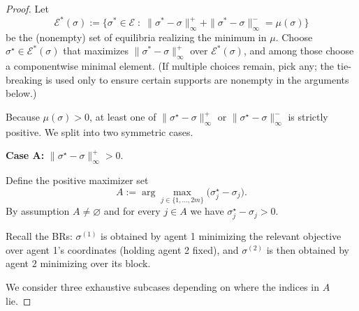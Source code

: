\documentclass[11pt]{article}
\begin{document}
\begin{proof}
Let
\[
\mathcal E^*(\sigma)
:=\Big\{\sigma^*\in\mathcal E \;:\; 
\|\sigma^*-\sigma\|_\infty^+ + \|\sigma^*-\sigma\|_\infty^- = \mu(\sigma)\Big\}
\]
be the (nonempty) set of equilibria realizing the minimum in \(\mu\).
Choose \(\sigma^\star\in\mathcal E^*(\sigma)\) that maximizes
\(\|\sigma^*-\sigma\|_\infty^+\) over \(\mathcal E^*(\sigma)\), and
among those choose a componentwise minimal element. (If multiple
choices remain, pick any; the tie-breaking is used only to ensure
certain supports are nonempty in the arguments below.)

Because \(\mu(\sigma)>0\), at least one of
\(\|\sigma^\star-\sigma\|_\infty^+\) or \(\|\sigma^\star-\sigma\|_\infty^-\)
is strictly positive. We split into two symmetric cases.

\medskip\noindent\textbf{Case A:} \(\|\sigma^\star-\sigma\|_\infty^+>0\).

Define the positive maximizer set
\[
A := \arg\max_{j\in\{1,\dots,2m\}} \big(\sigma^\star_j-\sigma_j\big).
\]
By assumption \(A\neq\varnothing\) and for every \(j\in A\) we have
\(\sigma^\star_j-\sigma_j>0\).

Recall the BRs: \(\sigma^{(1)}\) is obtained by agent 1 minimizing
the relevant objective over agent 1's coordinates (holding agent 2 fixed),
and \(\sigma^{(2)}\) is then obtained by agent 2 minimizing over its
block.

We consider three exhaustive subcases depending on where the indices
in \(A\) lie.


\end{proof}
\end{document}
